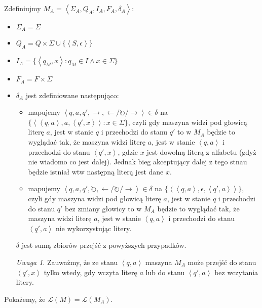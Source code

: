 \documentclass{article}
\theoremstyle{definition}
\theoremstyle{remark}
\newtheorem{remark}{Uwaga}[section]
\begin{document}
Zdefiniujmy \(M_A = \left<\Sigma_A, Q_A, I_A, F_A, \delta_A \right>\):
\begin{itemize}
\item \(\Sigma_A = \Sigma\)
\item \(Q_A = Q \times \Sigma \cup \{ \left< S, \epsilon \right> \} \)
\item \(I_A = \{ \left<q_M, x \right>: q_M \in I \land x \in \Sigma \}\)
\item \(F_A = F \times \Sigma\)
\item \(\delta_A\) jest zdefiniowane następująco:
\begin{itemize}
\item mapujemy \( \left<q, a, q', \rightarrow, \leftarrow / \circlearrowright / \rightarrow \right> \in \delta\) na \( \{ \left< \left<q,a\right>, a, \left<q',x\right> \right>: x \in \Sigma \} \),
czyli gdy maszyna widzi pod głowicą literę \(a\), jest w stanie \(q\) i przechodzi do stanu \(q'\) to w \(M_A\) będzie to wyglądać tak, że maszyna widzi literę \(a\), jest w stanie \(\left<q,a\right>\) i przechodzi do stanu \(\left<q',x\right>\), gdzie \(x\) jest dowolną literą z alfabetu (gdyż nie wiadomo co jest dalej). Jednak bieg akceptujący dalej z tego stnau będzie istniał wtw następną literą jest dane \(x\).

\item mapujemy \( \left<q, a, q', \circlearrowright, \leftarrow / \circlearrowright / \rightarrow \right> \in \delta\) na \( \{ \left< \left<q,a\right>, \epsilon, \left<q',a\right> \right>\} \), czyli gdy maszyna widzi pod głowicą literę \(a\), jest w stanie \(q\) i przechodzi do stanu \(q'\) bez zmiany głowicy to w \(M_A\) będzie to wyglądać tak, że maszyna widzi literę \(a\), jest w stanie \(\left<q,a\right>\) i przechodzi do stanu \(\left<q',a\right>\) nie wykorzystując litery.

\end{itemize}

\(\delta\) jest sumą zbiorów przejść z powyższych przypadków.

\begin{remark}\label{remark:transition}
    Zauważmy, że ze stanu \(\left<q,a\right>\) maszyna \(M_A\) może przejść do stanu \(\left<q',x\right>\) tylko wtedy,
    gdy wczyta literę \(a\) lub do stanu \(\left<q',a\right>\) bez wczytania litery.
\end{remark}

\end{itemize}

Pokażemy, że \(\mathcal{L}(M) = \mathcal{L}(M_A)\).
\end{document}

